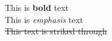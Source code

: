 \documentclass{article}
\begin{document}
This is \textbf{bold} text \\
This is \emph{emphasis} text \\
\sout{This text is striked through} \\
\end{document}
